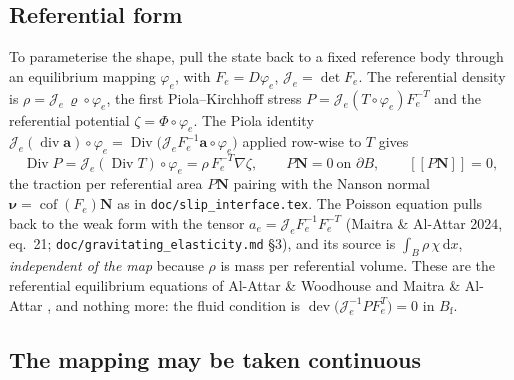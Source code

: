 \documentclass[11pt]{article}
\newcommand{\Jf}{\mathscr{J}}  %
\newcommand{\Bf}{B_{\mathrm{f}}}
\newcommand{\bN}{\mathbf{N}}
\newcommand{\bnu}{\bm{\nu}}
\newcommand{\jump}[1]{[\![#1]\!]}
\newcommand{\dx}{\,\mathrm{d}x}
\newcommand{\dev}{\operatorname{dev}}
\newcommand{\cof}{\operatorname{cof}}
\newcommand{\Div}{\operatorname{Div}}
\renewcommand{\div}{\operatorname{div}}
\begin{document}
\subsection{Referential form}

To parameterise the shape, pull the state back to a fixed reference body
through an equilibrium mapping $\varphi_e$, with $F_e = D\varphi_e$,
$\Jf _e = \det F_e$. The referential density is $\rho = \Jf _e\,\varrho\circ\varphi_e$,
the first Piola--Kirchhoff stress $P = \Jf _e (T\circ\varphi_e)F_e^{-T}$ and
the referential potential $\zeta = \Phi\circ\varphi_e$. The Piola
identity $\Jf _e(\div \mathbf{a})\circ\varphi_e = \Div\bigl(\Jf _e F_e^{-1}
\mathbf{a}\circ\varphi_e\bigr)$ applied row-wise to $T$ gives
\begin{equation}
  \Div P = \Jf _e (\Div T)\circ\varphi_e
         = \rho\,F_e^{-T}\nabla\zeta ,
  \qquad P\bN = 0 \ \text{on } \partial B,
  \qquad \jump{P\bN} = 0 ,
  \label{eq:equilibrium-ref}
\end{equation}
the traction per referential area $P\bN$ pairing with the Nanson
normal $\bnu = \cof(F_e)\bN$ as in \texttt{doc/slip\_interface.tex}.
The Poisson equation pulls back to the weak form with the tensor
$a_e = \Jf _e F_e^{-1}F_e^{-T}$ (Maitra \& Al-Attar 2024, eq.~21;
\texttt{doc/gravitating\_elasticity.md} \S3), and its source is
$\int_B \rho\,\chi\dx$, \emph{independent of the map} because $\rho$ is
mass per referential volume. These are the referential equilibrium
equations of Al-Attar \& Woodhouse \cite{AW10} and Maitra \& Al-Attar
\cite{MA24}, and nothing more: the fluid condition is
$\dev\bigl(\Jf _e^{-1} P F_e^{T}\bigr) = 0$ in $\Bf$.

\subsection{The mapping may be taken continuous}
\label{sec:continuity}
\end{document}
